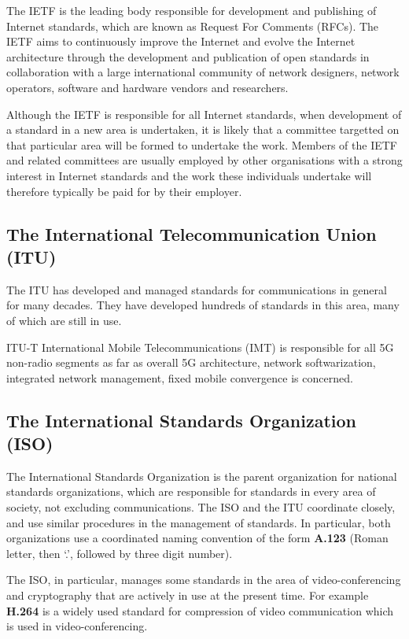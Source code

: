 The IETF is the leading body responsible for development and publishing of
Internet standards, which are known as Request For Comments (RFCs). 
The IETF aims to continuously improve the Internet and
evolve the Internet architecture through the development and publication
of open standards in collaboration with a large international community
of network designers, network operators, software and hardware vendors
and researchers.

Although the IETF is responsible for all Internet standards, when development
of a standard in a new area is undertaken, it is likely that a committee targetted
on that particular area will be formed to undertake the work. Members of the IETF
and related committees are usually employed by other organisations with a strong
interest in Internet standards and the work these individuals undertake will
therefore typically be paid for by their employer.

\subsection{The International Telecommunication Union (ITU)}\label{ITU}

The ITU has developed and managed standards for communications in general
for many decades. They have developed hundreds of standards in this area, many
of which are still in use.

ITU-T International Mobile Telecommunications (IMT) is responsible for all 5G non-radio
segments as far as overall 5G architecture, network softwarization,
integrated network management, fixed mobile convergence is concerned.


\subsection{The International Standards Organization (ISO)}

The International Standards Organization is the parent organization for national standards
organizations, which are responsible for standards in every area of society, not
excluding communications. The ISO and the ITU coordinate closely, and use similar
procedures in the management of standards. In particular, both organizations use
a coordinated naming convention of the form {\bf A.123} (Roman letter, then `.',
followed by three digit number).

The ISO, in particular, manages some standards in the area of video-conferencing
and cryptography that are actively in use at the present time. For example {\bf H.264}
is a widely used standard for compression of video communication which is used
in video-conferencing.


